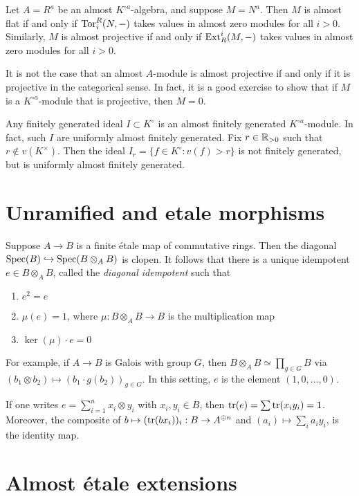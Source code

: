 \documentclass{article}
\begin{document}
Let $A=R^a$ be an almost $K^{\circ a}$-algebra, and suppose $M=N^a$. Then $M$ is 
almost flat if and only if $\operatorname{Tor}_i^R(N,-)$ takes values in almost zero 
modules for all $i>0$. Similarly, $M$ is almost projective if and only if 
$\operatorname{Ext}_R^i(M,-)$ takes values in almost zero modules for all $i>0$. 

It is not the case that an almost $A$-module is almost projective if and only 
if it is projective in the categorical sense. In fact, it is a good exercise to 
show that if $M$ is a $K^{\circ a}$-module that is projective, then $M=0$. 

Any finitely generated ideal $I\subset K^\circ$ is an almost finitely generated 
$K^{\circ a}$-module. In fact, such $I$ are uniformly almost finitely generated. 
Fix $r\in \mathbb{R}_{>0}$ such that $r\notin v(K^\times)$. Then the ideal 
$I_r=\{f\in K^\circ:v(f)>r\}$ is not finitely generated, but is uniformly almost 
finitely generated. 






\section{Unramified and etale morphisms}

Suppose $A\to B$ is a finite \'etale map of commutative rings. Then the 
diagonal $\operatorname{Spec}(B)\hookrightarrow \operatorname{Spec}(B\otimes_A B)$ is clopen. It follows 
that there is a unique idempotent $e\in B\otimes_A B$, called the \emph{diagonal 
idempotent} such that 
\begin{enumerate}
  \item $e^2=e$ 
  \item $\mu(e)=1$, where $\mu:B\otimes_A B\to B$ is the multiplication map 
  \item $\ker(\mu)\cdot e = 0$ 
\end{enumerate}

For example, if $A\to B$ is Galois with group $G$, then 
$B\otimes_A B\simeq \prod_{g\in G} B$ via 
$(b_1\otimes b_2)\mapsto (b_1\cdot g(b_2))_{g\in G}$. In this setting, $e$ is the 
element $(1,0,\dots,0)$. 

If one writes $e=\sum_{i=1}^n x_i\otimes y_i$ with $x_i,y_i\in B$, then 
$\operatorname{tr}(e) = \sum \operatorname{tr}(x_i y_i) = 1$. Moreover, the composite of 
$b\mapsto (\operatorname{tr}(b x_i))_i:B\to A^{\oplus n}$ and 
$(a_i)\mapsto \sum_i a_i y_i$, is the identity map. 




\section{Almost \'etale extensions}
\end{document}
